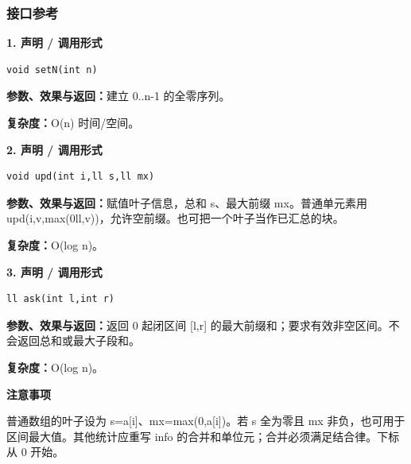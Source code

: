 \documentclass[UTF8,a4paper,10pt]{ctexart}
\newcommand{\TemplNote}[1]{\textbf{注意事项}\par #1\par}
\begin{document}
\subsubsection*{接口参考}
\noindent\begin{minipage}{\textwidth}
\textbf{1. 声明 / 调用形式}
\begin{lstlisting}
void setN(int n)
\end{lstlisting}
\textbf{参数、效果与返回：}建立 0..n-1 的全零序列。

\textbf{复杂度：}O(n) 时间/空间。

\end{minipage}\par\vspace{0.4em}
\noindent\begin{minipage}{\textwidth}
\textbf{2. 声明 / 调用形式}
\begin{lstlisting}
void upd(int i,ll s,ll mx)
\end{lstlisting}
\textbf{参数、效果与返回：}赋值叶子信息，总和 s、最大前缀 mx。普通单元素用 upd(i,v,max(0ll,v))，允许空前缀。也可把一个叶子当作已汇总的块。

\textbf{复杂度：}O(log n)。

\end{minipage}\par\vspace{0.4em}
\noindent\begin{minipage}{\textwidth}
\textbf{3. 声明 / 调用形式}
\begin{lstlisting}
ll ask(int l,int r)
\end{lstlisting}
\textbf{参数、效果与返回：}返回 0 起闭区间 [l,r] 的最大前缀和；要求有效非空区间。不会返回总和或最大子段和。

\textbf{复杂度：}O(log n)。

\TemplNote{普通数组的叶子设为 s=a[i]、mx=max(0,a[i])。若 s 全为零且 mx 非负，也可用于区间最大值。其他统计应重写 info 的合并和单位元；合并必须满足结合律。下标从 0 开始。}
\end{minipage}\par\vspace{0.4em}
\end{document}
